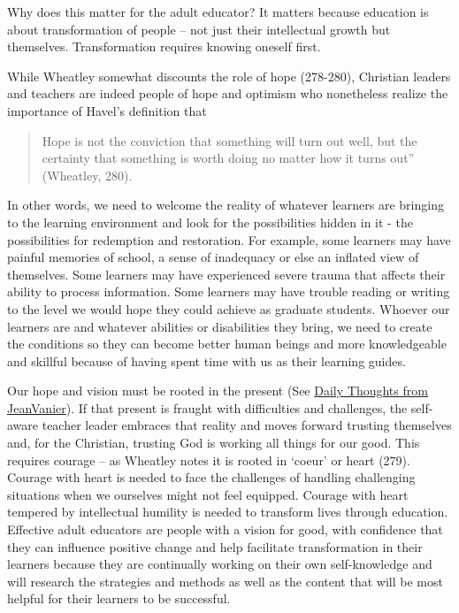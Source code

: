 \documentclass[
]{book}
\begin{document}
Why does this matter for the adult educator? It matters because education is about transformation of people -- not just their intellectual growth but themselves. Transformation requires knowing oneself first.

While Wheatley somewhat discounts the role of hope (278-280), Christian leaders and teachers are indeed people of hope and optimism who nonetheless realize the importance of Havel's definition that

\begin{quote}
Hope is not the conviction that something will turn out well, but the certainty that something is worth doing no matter how it turns out'' (Wheatley, 280).
\end{quote}

In other words, we need to welcome the reality of whatever learners are bringing to the learning environment and look for the possibilities hidden in it - the possibilities for redemption and restoration. For example, some learners may have painful memories of school, a sense of inadequacy or else an inflated view of themselves. Some learners may have experienced severe trauma that affects their ability to process information. Some learners may have trouble reading or writing to the level we would hope they could achieve as graduate students. Whoever our learners are and whatever abilities or disabilities they bring, we need to create the conditions so they can become better human beings and more knowledgeable and skillful because of having spent time with us as their learning guides.

Our hope and vision must be rooted in the present (See \href{http://quotetab.com/quotes/by-jean-vanier}{Daily Thoughts from JeanVanier}). If that present is fraught with difficulties and challenges, the self-aware teacher leader embraces that reality and moves forward trusting themselves and, for the Christian, trusting God is working all things for our good. This requires courage -- as Wheatley notes it is rooted in `coeur' or heart (279). Courage with heart is needed to face the challenges of handling challenging situations when we ourselves might not feel equipped. Courage with heart tempered by intellectual humility is needed to transform lives through education. Effective adult educators are people with a vision for good, with confidence that they can influence positive change and help facilitate transformation in their learners because they are continually working on their own self-knowledge and will research the strategies and methods as well as the content that will be most helpful for their learners to be successful.
\end{document}
